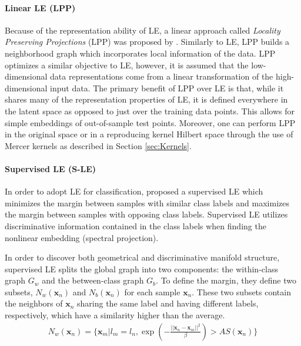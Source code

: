 \paragraph{Linear LE (LPP)}
Because of the representation ability of LE, a linear approach called \textit{Locality Preserving Projections} (LPP) was proposed by \cite{He2003LPP}.  Similarly to LE, LPP builds a neighborhood graph which incorporates local information of the data.  LPP optimizes a similar objective to LE, however, it is assumed that the low-dimensional data representations come from a linear transformation of the high-dimensional input data.  The primary benefit of LPP over LE is that, while it shares many of the representation properties of LE, it is defined everywhere in the latent space as opposed to just over the training data points.  This allows for simple embeddings of out-of-sample test points.  Moreover, one can perform LPP in the original space or in a reproducing kernel Hilbert space through the use of Mercer kernels as described in Section \ref{sec:Kernels}.

\paragraph{Supervised LE (S-LE)}
In order to adopt LE for classification, \cite{Raducanu2012SupervisedNonlinearDimReduction} proposed a supervised LE which minimizes the margin between samples with similar class labels and maximizes the margin between samples with opposing class labels.  Supervised LE utilizes discriminative information contained in the class labels when finding the nonlinear embedding (spectral projection). 

In order to discover both geometrical and discriminative manifold structure, supervised LE splits the global graph into two components: the within-class graph $G_{w}$ and the between-class graph $G_{b}$.  To define the margin, they define two subsets, $N_{w}(\bm{x}_{n})$ and $N_{b}(\bm{x}_{n})$ for each sample $\bm{x}_{n}$.  These two subsets contain the neighbors of $\bm{x}_{n}$ sharing the same label and having different labels, respectively, which have a similarity higher than the average.
\begin{align}
	N_{w}(\bm{x}_n) = \{\bm{x}_m |l_{m} = l_{n}, \exp \left (- \frac{||\bm{x}_{n} - \bm{x}_{m} ||^{2}}{\beta} \right)  > AS(\bm{x}_{n}) \} \label{eq:s_le_within_neighbor}
\end{align}

